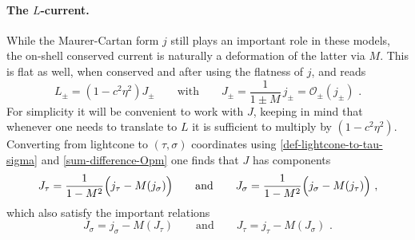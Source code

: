 \documentclass[12pt]{article}
\numberwithin{equation}{section}
\begin{document}
\paragraph{The $L$-current.} While the Maurer-Cartan form $j$ still plays an important role in these models, the on-shell conserved current is naturally a deformation of the latter via $M$. This is flat as well, when conserved and after using the flatness of $j$, and reads
\begin{equation}
L_{\pm}=(1-c^2\eta^2)J_{\pm}
\qquad \text{with} \qquad 
J_{\pm}=\frac{1}{1\pm M} \, j_{\pm} =\mathcal{O}_{\pm}(j_{\pm}) \,\, .
\end{equation}
For simplicity it will be convenient to work with $J$, keeping in mind that whenever one needs to translate to $L$ it is sufficient to multiply by $(1-c^2\eta^2)$. Converting from lightcone to $(\tau,\sigma)$ coordinates using \eqref{def-lightcone-to-tau-sigma} and \eqref{sum-difference-Opm} one finds that $J$ has components
\begin{equation}\label{YB-Jtausigma}
J_{\tau}=\frac{1}{1-M^2}\Bigl( j_{\tau}-M(j_{\sigma})\Bigr)
\qquad \text{and} \qquad 
J_{\sigma}=\frac{1}{1-M^2}\Bigl( j_{\sigma}-M(j_{\tau})\Bigr) \,\, ,
\end{equation}
which also satisfy the important relations
\begin{equation}\label{Jtausigma-relations}
J_{\sigma}=j_{\sigma}-M(J_{\tau}) 
\qquad \text{and} \qquad 
J_{\tau}=j_{\tau}-M(J_{\sigma}) \,\, .
\end{equation}
\end{document}
